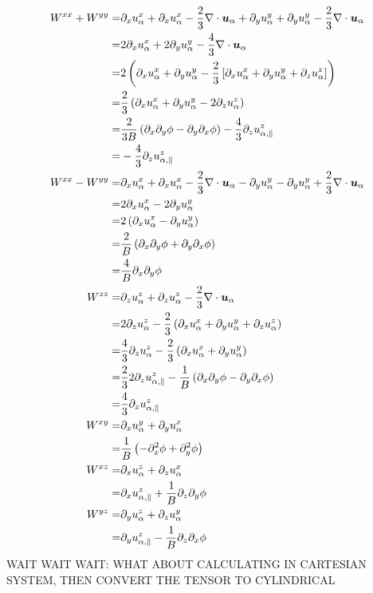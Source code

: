 \begin{align*}
W^{xx} + W^{yy}
=&
\partial_x u^{x}_{\a}
+ \partial_x u^{x}_{\a}
- \frac{2}{3} \div \ve{u}_{\a}
+ \partial_y u^{y}_{\a}
+ \partial_y u^{y}_{\a}
- \frac{2}{3} \div \ve{u}_{\a}
\\
%
=&
2\partial_x u^{x}_{\a}
+ 2\partial_y u^{y}_{\a}
- \frac{4}{3} \div \ve{u}_{\a}
\\
%
=&
2\L(\partial_x u^{x}_{\a}
    + \partial_y u^{y}_{\a}
    - \frac{2}{3} \L[\partial_x u^{x}_{\a}
          +\partial_y u^{y}_{\a}
          +\partial_z u^{z}_{\a}
                      \R]
\R)
\\
%
=&
\frac{2}{3}\L(\partial_x u^{x}_{\a}
          + \partial_y u^{y}_{\a}
          - 2\partial_z u^{z}_{\a}
\R)
\\
%
=&
\frac{2}{3B}
\L(\partial_x \partial_y \phi
- \partial_y \partial_x \phi
\R)
-
\frac{4}{3}
 \partial_z u^{z}_{\a,\|}
\\
%
=&
-
\frac{4}{3}
\partial_z u^{z}_{\a,\|}
\\
%
%
%
W^{xx} - W^{yy}
=&
\partial_x u^{x}_{\a}
+ \partial_x u^{x}_{\a}
- \frac{2}{3} \div \ve{u}_{\a}
- \partial_y u^{y}_{\a}
- \partial_y u^{y}_{\a}
+ \frac{2}{3} \div \ve{u}_{\a}
\\
%
=&
2\partial_x u^{x}_{\a} -2 \partial_y u^{y}_{\a}
\\
%
=&
2\L(\partial_x u^{x}_{\a} - \partial_y u^{y}_{\a} \R)
%
\\
=&
\frac{2}{B}
\L(\partial_x \partial_y \phi + \partial_y \partial_x \phi \R)
%
\\
=&
\frac{4}{B} \partial_x \partial_y \phi
\\
%
%
%
%
W^{zz}
=&
\partial_z u^{z}_{\a} + \partial_z u^{z}_{\a} - \frac{2}{3} \div \ve{u}_{\a}
\\
%
=&
2\partial_z u^{z}_{\a} - \frac{2}{3}
    \L(\partial_x u^{x}_{\a}
       +\partial_y u^{y}_{\a}
       +\partial_z u^{z}_{\a}
    \R)
\\
%
=&
\frac{4}{3} \partial_z u^{z}_{\a} - \frac{2}{3}
    \L(\partial_x u^{x}_{\a}
       +\partial_y u^{y}_{\a}
    \R)
\\
%
=&
\frac{2}{3}
2 \partial_z u^{z}_{\a,\|} -
    \frac{1}{B}
    \L(\partial_x \partial_y \phi
       - \partial_y \partial_x \phi
    \R)
\\
%
=& \frac{4}{3} \partial_z u^{z}_{\a,\|}
\\
%
%
%
%
W^{xy}
=&
\partial_x u^{y}_{\a} + \partial_y u^{x}_{\a}
\\
%
=&
\frac{1}{B}\L( - \partial_x^2 \phi + \partial_y^2 \phi \R)
\\
%
%
%
%
W^{xz}
=&
\partial_x u^{z}_{\a} + \partial_z u^{x}_{\a}
%
\\
=&
\partial_x u^{z}_{\a, \|} + \frac{1}{B}\partial_z \partial_y \phi
\\
%
%
%
%
W^{yz}
=&
\partial_y u^{z}_{\a} + \partial_z u^{y}_{\a}
%
\\
=&
\partial_y u^{z}_{\a,\|} - \frac{1}{B} \partial_z \partial_x \phi
\end{align*}
%
WAIT WAIT WAIT: WHAT ABOUT CALCULATING IN CARTESIAN SYSTEM, THEN CONVERT THE
TENSOR TO CYLINDRICAL

